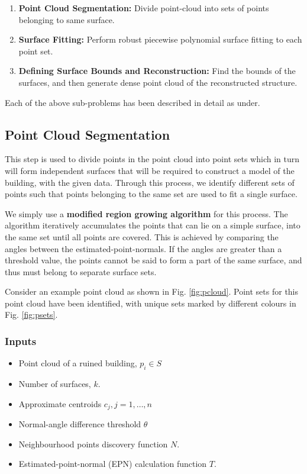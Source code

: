 \documentclass[12pt,a4paper]{article}
\begin{document}
    \begin{enumerate}
        \item \textbf{Point Cloud Segmentation:} Divide point-cloud into sets of points belonging to same surface.
        \item \textbf{Surface Fitting:} Perform robust piecewise polynomial surface fitting to each point set.
        \item \textbf{Defining Surface Bounds and Reconstruction:} Find the bounds of the surfaces, and then generate dense point cloud of the reconstructed structure.
    \end{enumerate}
    
    Each of the above sub-problems has been described in detail as under.
    
    \subsection{Point Cloud Segmentation}
    
    This step is used to divide points in the point cloud into point sets which in turn will form independent surfaces that will be required to construct a model of the building, with the given data. Through this process, we identify different sets of points such that points belonging to the same set are used to fit a single surface.
    
    We simply use a \textbf{modified region growing algorithm} for this process. The algorithm iteratively accumulates the points that can lie on a simple surface, into the same set until all points are covered. This is achieved by comparing the angles between the estimated-point-normals. If the angles are greater than a threshold value, the points cannot be said to form a part of the same surface, and thus must belong to separate surface sets.
    
    Consider an example point cloud as shown in Fig. \ref{fig:pcloud}. Point sets for this point cloud have been identified, with unique sets marked by different colours in Fig. \ref{fig:psets}.
    

    \subsubsection{Inputs}
    \begin{itemize}
        \itemsep0em 
        \item Point cloud of a ruined building, $p_i \in S$
        \item Number of surfaces, $k$.
        \item Approximate centroids $c_{j}, j=1,\dots,n$
        \item Normal-angle difference threshold $\theta$
        \item Neighbourhood points discovery function $N$.
        \item Estimated-point-normal (EPN) calculation function $T$.
    \end{itemize}
    
\end{document}
